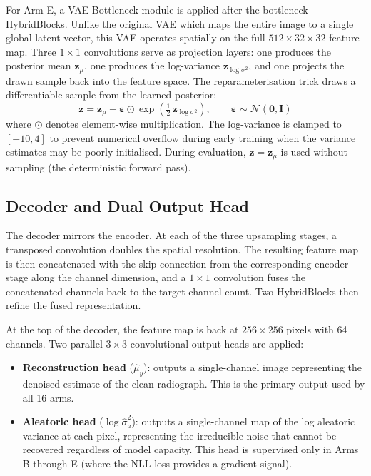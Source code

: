 \documentclass[12pt, a4paper, twoside, openright]{book}
\begin{document}
For Arm E, a VAE Bottleneck module is applied after the bottleneck
HybridBlocks. Unlike the original VAE \cite{kingma_auto-encoding_2014} which maps the
entire image to a single global latent vector, this VAE operates spatially on the full
$512 \times 32 \times 32$ feature map. Three $1 \times 1$ convolutions serve as projection
layers: one produces the posterior mean $\mathbf{z}_\mu$, one produces the log-variance
$\mathbf{z}_{\log\sigma^2}$, and one projects the drawn sample back into the feature space.
The reparameterisation trick \cite{kingma_auto-encoding_2014} draws a differentiable sample
from the learned posterior:
\begin{equation}
\label{eq:methods:reparam}
\mathbf{z} = \mathbf{z}_\mu + \boldsymbol{\varepsilon} \odot \exp\!\left(\tfrac{1}{2}\,\mathbf{z}_{\log\sigma^2}\right),
\qquad \boldsymbol{\varepsilon} \sim \mathcal{N}(\mathbf{0}, \mathbf{I})
\end{equation}
where $\odot$ denotes element-wise multiplication. The log-variance is clamped to
$[-10, 4]$ to prevent numerical overflow during early training when the variance estimates
may be poorly initialised. During evaluation, $\mathbf{z} = \mathbf{z}_\mu$ is used without
sampling (the deterministic forward pass).

\subsection{Decoder and Dual Output Head}
\label{sec:methods:architecture:decoder}

The decoder mirrors the encoder. At each of the three upsampling stages, a transposed
convolution doubles the spatial resolution. The resulting feature map is then concatenated
with the skip connection from the corresponding encoder stage along the channel dimension,
and a $1 \times 1$ convolution fuses the concatenated channels back to the target channel
count. Two HybridBlocks then refine the fused representation.

At the top of the decoder, the feature map is back at $256 \times 256$ pixels with 64
channels. Two parallel $3 \times 3$ convolutional output heads are applied:

\begin{itemize}
\item \textbf{Reconstruction head} ($\hat{\mu}_y$): outputs a single-channel image
  representing the denoised estimate of the clean radiograph. This is the primary output
  used by all 16 arms.
\item \textbf{Aleatoric head} ($\log\hat{\sigma}^2_a$): outputs a single-channel map of the
  log aleatoric variance at each pixel, representing the irreducible noise that cannot be
  recovered regardless of model capacity. This head is supervised only in Arms B through E
  (where the NLL loss provides a gradient signal).
\end{itemize}
\end{document}

